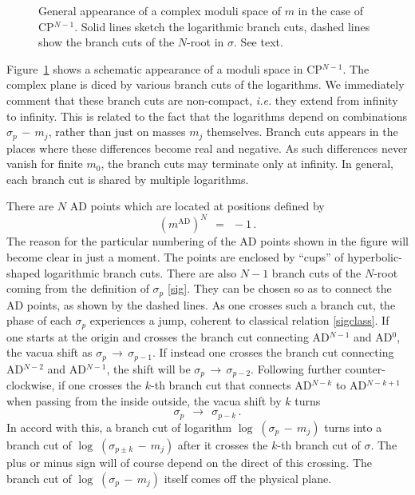 \documentclass[epsfig,12pt]{article}
\def\beq{\begin{equation}}
\def\eeq{\end{equation}}
\def\beq{\begin{equation}}
\def\eeq{\end{equation}}
\begin{document}
\begin{figure}
\begin{center}
\epsfxsize=9.0cm
\caption{General appearance of a complex moduli space of $ m $ in the case of CP$^{N-1}$. 
	 Solid lines sketch the logarithmic branch cuts, dashed lines show the branch cuts of the $N$-root in $\sigma$.
	 See text.}
\label{fcpn}
\end{center}
\end{figure}
	Figure~\ref{fcpn} shows a schematic appearance of a moduli space in CP$^{N-1}$.
	The complex plane is diced by various branch cuts of the logarithms.
	We immediately comment that these branch cuts are non-compact, 
	{\it i.e.} they extend from infinity to infinity.
	This is related to the fact that the logarithms depend on combinations $ \sigma_p \,-\, m_j $,
	rather than just on masses $ m_j $ themselves.
	Branch cuts appears in the places where these differences become real and negative.
	As such differences never vanish for finite $ m_0 $, the branch cuts may terminate only at infinity. 
	In general, each branch cut is shared by multiple logarithms.

	There are $ N $ AD points which are located at positions defined by
\beq
	\left( m^\text{AD} \right)^N ~~=~~ -1 \,.
\eeq
	The reason for the particular numbering of the AD points shown in the figure will become clear in just a moment.
	The points are enclosed by ``cups'' of hyperbolic-shaped logarithmic branch cuts.
	There are also $ N - 1 $ branch cuts of the $ N $-root coming from the definition of $ \sigma_p $ \eqref{sig}.
	They can be chosen so as to connect the AD points, as shown by the dashed lines.
	As one crosses such a branch cut, the phase of each $ \sigma_p $ experiences a jump, 
	coherent to classical relation \eqref{sigclass}. 
	If one starts at the origin and crosses the branch cut connecting AD$^{N-1}$ and AD$^0$, 
	the vacua shift as $ \sigma_p \,\to\, \sigma_{p-1} $.
	If instead one crosses the branch cut connecting AD$^{N-2}$ and AD$^{N-1}$,
	the shift will be $ \sigma_p \,\to\, \sigma_{p-2} $.
	Following further counter-clockwise, if one crosses the $ k $-th branch cut 
	that connects AD$^{N-k}$ to AD$^{N-k+1}$ when passing from the inside outside, the vacua shift by $ k $ turns
\beq
\label{sigshift}
	\sigma_p ~~\to~~ \sigma_{p-k} \,.
\eeq
	In accord with this, a branch cut of logarithm $ \log\;( \sigma_p \,-\, m_j ) $ turns into 
	a branch cut of $ \log\;( \sigma_{p \pm k} \,-\, m_j ) $ after it crosses the $ k $-th branch cut of $ \sigma $. 
	The plus or minus sign will of course depend on the direct of this crossing. 
	The branch cut of $ \log\;( \sigma_p \,-\, m_j ) $ itself comes off the physical plane.
\end{document}
